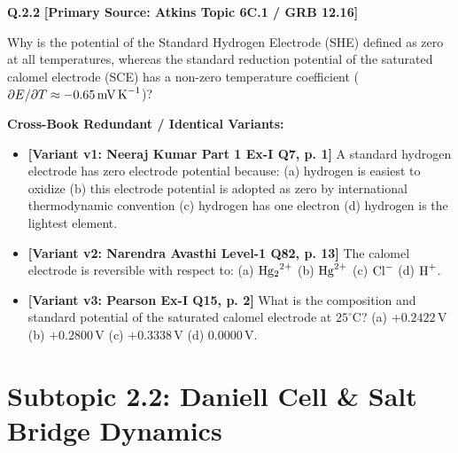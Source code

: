 \begin{problembox}
\textbf{Q.2.2} \hfill \textbf{[Primary Source: Atkins Topic 6C.1 / GRB  12.16]}
\label{q:qb-c2-02}

Why is the potential of the Standard Hydrogen Electrode (SHE) defined as zero at all temperatures, whereas the standard reduction potential of the saturated calomel electrode (SCE) has a non-zero temperature coefficient ($\partial E/\partial T \approx -0.65\,\text{mV\,K}^{-1}$)?

\tcbline
\textbf{\color{accentamber}Cross-Book Redundant / Identical Variants:}
\begin{itemize}[leftmargin=*,itemsep=2pt]
    \item \textbf{[Variant v1: Neeraj Kumar Part 1 Ex-I Q7, p. 1]} A standard hydrogen electrode has zero electrode potential because: (a) hydrogen is easiest to oxidize (b) this electrode potential is adopted as zero by international thermodynamic convention (c) hydrogen has one electron (d) hydrogen is the lightest element.
    \item \textbf{[Variant v2: Narendra Avasthi Level-1 Q82, p. 13]} The calomel electrode is reversible with respect to: (a) $\ce{Hg2^2+}$ (b) $\ce{Hg^2+}$ (c) $\ce{Cl-}$ (d) $\ce{H+}$.
    \item \textbf{[Variant v3: Pearson Ex-I Q15, p. 2]} What is the composition and standard potential of the saturated calomel electrode at $25^\circ\text{C}$? (a) $+0.2422\,\text{V}$ (b) $+0.2800\,\text{V}$ (c) $+0.3338\,\text{V}$ (d) $0.0000\,\text{V}$.
\end{itemize}
\end{problembox}

\section{Subtopic 2.2: Daniell Cell \& Salt Bridge Dynamics}

